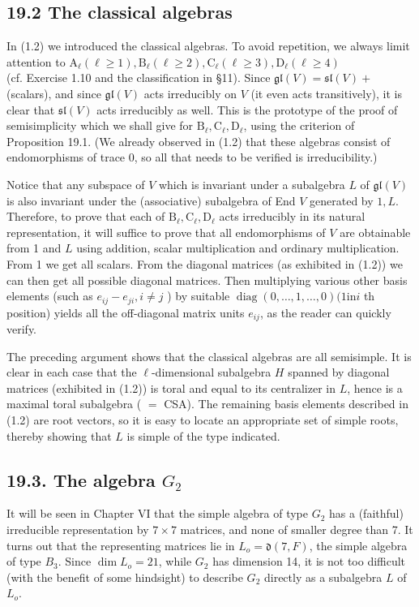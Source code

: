 \documentclass[10pt]{article}
\begin{document}
\subsection*{19.2 The classical algebras}
In (1.2) we introduced the classical algebras. To avoid repetition, we always limit attention to $\mathrm{A}_{\ell}(\ell \geq 1), \mathrm{B}_{\ell}(\ell \geq 2), \mathrm{C}_{\ell}(\ell \geq 3), \mathrm{D}_{\ell}(\ell \geq 4)$\\
(cf. Exercise 1.10 and the classification in §11). Since $\mathfrak{g l}(V)=\mathfrak{s l}(V)+$ (scalars), and since $\mathfrak{g l}(V)$ acts irreducibly on $V$ (it even acts transitively), it is clear that $\mathfrak{s l}(V)$ acts irreducibly as well. This is the prototype of the proof of semisimplicity which we shall give for $\mathrm{B}_{\ell}, \mathrm{C}_{\ell}, \mathrm{D}_{\ell}$, using the criterion of Proposition 19.1. (We already observed in (1.2) that these algebras consist of endomorphisms of trace 0, so all that needs to be verified is irreducibility.)

Notice that any subspace of $V$ which is invariant under a subalgebra $L$ of $\mathfrak{g l}(V)$ is also invariant under the (associative) subalgebra of End $V$ generated by $1, L$. Therefore, to prove that each of $\mathrm{B}_{\ell}, \mathrm{C}_{\ell}, \mathrm{D}_{\ell}$ acts irreducibly in its natural representation, it will suffice to prove that all endomorphisms of $V$ are obtainable from 1 and $L$ using addition, scalar multiplication and ordinary multiplication. From 1 we get all scalars. From the diagonal matrices (as exhibited in (1.2)) we can then get all possible diagonal matrices. Then multiplying various other basis elements (such as $e_{i j}-e_{j i}, i \neq j$ ) by suitable $\operatorname{diag}(0, \ldots, 1, \ldots, 0)(1 \mathrm{in} i$ th position) yields all the off-diagonal matrix units $e_{i j}$, as the reader can quickly verify.

The preceding argument shows that the classical algebras are all semisimple. It is clear in each case that the $\ell$-dimensional subalgebra $H$ spanned by diagonal matrices (exhibited in (1.2)) is toral and equal to its centralizer in $L$, hence is a maximal toral subalgebra ( $=$ CSA). The remaining basis elements described in (1.2) are root vectors, so it is easy to locate an appropriate set of simple roots, thereby showing that $L$ is simple of the type indicated.

\subsection*{19.3. The algebra $G_{2}$}
It will be seen in Chapter VI that the simple algebra of type $G_{2}$ has a (faithful) irreducible representation by $7 \times 7$ matrices, and none of smaller degree than 7. It turns out that the representing matrices lie in $L_{o}=\mathfrak{d}(7, F)$, the simple algebra of type $B_{3}$. Since $\operatorname{dim} L_{o}=21$, while $G_{2}$ has dimension 14, it is not too difficult (with the benefit of some hindsight) to describe $G_{2}$ directly as a subalgebra $L$ of $L_{o}$.
\end{document}

